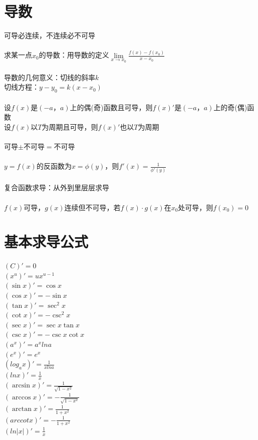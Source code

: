 \documentclass{article}
\begin{document}
\begin{flushleft}
	\LARGE
	
	\section{导数}
	
	可导必连续，不连续必不可导\\
	~\\
	求某一点$x_0$的导数：用导数的定义$\lim\limits_{x\to x_0} \frac{f(x)-f(x_0
		)}{x-x_0}$\\
	~\\
	导数的几何意义：切线的斜率$k$\\
	切线方程：$y-y_0=k(x-x_0)$\\
	~\\
	设$f(x)$是$(-a，a)$上的偶(奇)函数且可导，则$f(x)'$是$(-a，a)$上的奇(偶)函数\\
	设$f(x)$以$T$为周期且可导，则$f(x)'$也以$T$为周期\\
	~\\
	可导$\pm$不可导$=$不可导\\
	~\\
	$y=f(x)$的反函数为$x=\phi(y)$，则$f'(x)=\frac{1}{\phi'(y)}$\\
	~\\
	复合函数求导：从外到里层层求导\\
	~\\
	$f(x)$可导，$g(x)$连续但不可导，若$f(x)\cdot g(x)$在$x_0$处可导，则$f(x_0)=0$\\
	
	\section{基本求导公式}
	
	$(C)'=0$\\
	$(x^u)'=ux^{u-1}$\\
	$(\sin x)'=\cos x$\\
	$(\cos x)'=-\sin x$\\
	$(\tan x)'=\sec^2 x$\\
	$(\cot x)'=-\csc^2 x$\\
	$(\sec x)'=\sec x\tan x$\\
	$(\csc x)'=-\csc x\cot x$\\
	$(a^x)'=a^xlna$\\
	$(e^x)'=e^x$\\
	$(log_ax)'=\frac{1}{xlna}$\\
	$(lnx)'=\frac{1}{x}$\\
	$(\arcsin x)'=\frac{1}{\sqrt{1-x^2}}$\\
	$(\arccos x)'=-\frac{1}{\sqrt{1-x^2}}$\\
	$(\arctan x)'=\frac{1}{1+x^2}$\\
	$(arccot x)'=-\frac{1}{1+x^2}$\\
	$(ln|x|)'=\frac{1}{x}$\\
	

\end{flushleft}
\end{document}
